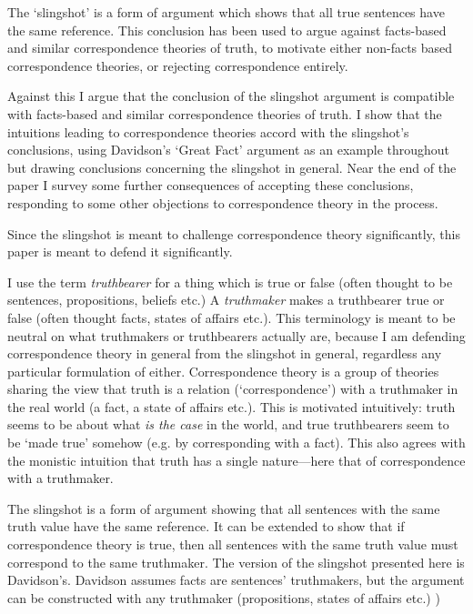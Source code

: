 The `slingshot' is a form of argument which shows that all true sentences have the same reference.
This conclusion has been used to argue against facts-based and similar correspondence theories of truth, to motivate either non-facts based correspondence theories, or rejecting correspondence entirely.

Against this I argue that the conclusion of the slingshot argument is compatible with facts-based and similar correspondence theories of truth.
I show that the intuitions leading to correspondence theories accord with the slingshot's conclusions, using Davidson's `Great Fact' argument as an example throughout but drawing conclusions concerning the slingshot in general.
Near the end of the paper I survey some further consequences of accepting these conclusions, responding to some other objections to correspondence theory in the process.

Since the slingshot is meant to challenge correspondence theory significantly, this paper is meant to defend it significantly.

I use the term \textit{truthbearer} for a thing which is true or false (often thought to be sentences, propositions, beliefs etc.)
A \textit{truthmaker} makes a truthbearer true or false (often thought facts, states of affairs etc.).
This terminology is meant to be neutral on what truthmakers or truthbearers actually are, because I am defending correspondence theory in general from the slingshot in general, regardless any particular formulation of either.
Correspondence theory is a group of theories sharing the view that truth is a relation (`correspondence') with a truthmaker in the real world (a fact, a state of affairs etc.).
This is motivated intuitively: truth seems to be about what \emph{is the case} in the world, and true truthbearers seem to be `made true' somehow (e.g. by corresponding with a fact).
This also agrees with the monistic intuition that truth has a single nature---here that of correspondence with a truthmaker.

The slingshot is a form of argument showing that all sentences with the same truth value have the same reference.
It can be extended to show that if correspondence theory is true, then all sentences with the same truth value must correspond to the same truthmaker.
The version of the slingshot presented here is Davidson's.
\parencite[753]{Davidson_1969}
Davidson assumes facts are sentences' truthmakers, but the argument can be constructed with any truthmaker (propositions, states of affairs etc.) \parencite[753]{Davidson_1969})

